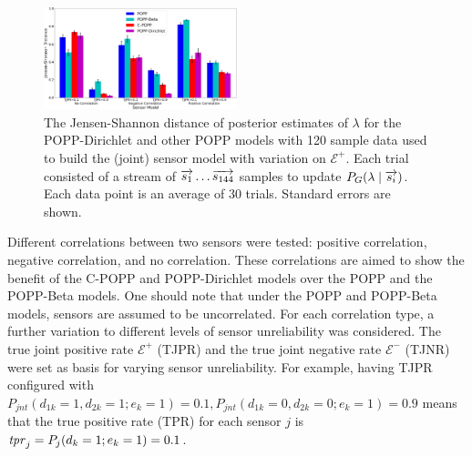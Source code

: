 \begin{figure}[t!]
	\centering
	\includegraphics[width=0.5\textwidth]{./figures/tjpr_comparison_120_kl.png}
	\caption{The Jensen-Shannon distance of posterior estimates of $\lambda$ for the POPP-Dirichlet and other POPP models with 120 sample data used to build the (joint) sensor model with variation on $\mathcal{E^+}$. Each trial consisted of a stream of $\protect\overrightarrow{s_1} \ldots \protect\overrightarrow{s_{144}}$ samples to update $P_G(\lambda \mid \protect\overrightarrow{s_i})$. Each data point is an average of 30 trials. Standard errors are shown.} 
	\label{fig:tjpr_comparison_120_kl}
\end{figure}

Different correlations between two sensors were tested: positive correlation, negative correlation, and no correlation. These correlations are aimed to show the benefit of the C-POPP and POPP-Dirichlet models over the POPP and the POPP-Beta models. One should note that under the POPP and POPP-Beta models, sensors are assumed to be uncorrelated. For each correlation type, a further variation to different levels of sensor unreliability was considered. The true joint positive rate $\mathcal{E^+}$ (TJPR) and the true joint negative rate $\mathcal{E^-}$ (TJNR) were set as basis for varying sensor unreliability. For example, having TJPR configured with $P_{jnt}(d_{1k}=1, d_{2k}=1 ; e_k=1) = 0.1, P_{jnt}(d_{1k}=0, d_{2k}=0 ; e_k=1) = 0.9$ means that the true positive rate (TPR) for each sensor $j$ is $\textrm{\textit{tpr}}_j = P_j(d_k = 1; e_k=1) = 0.1$.

